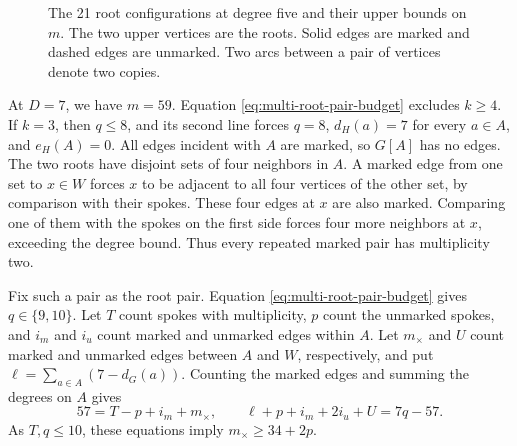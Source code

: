 \documentclass[preprint,11pt,numbers]{elsarticle-arxiv}
\makeatletter
\newcommand{\FloatBarrier}{\par\ifx\@deferlist\@empty\else\clearpage\fi}}
\numberwithin{equation}{section}
\theoremstyle{definition}
\makeatother
\begin{document}
\begin{figure}[htbp]
\caption{The 21 root configurations at degree five and their upper bounds on $m$. The two upper vertices are the roots. Solid edges are marked and dashed edges are unmarked. Two arcs between a pair of vertices denote two copies.}
\label{fig:finite-five-spokes}
\end{figure}
\FloatBarrier

At $D=7$, we have $m=59$. Equation
\eqref{eq:multi-root-pair-budget} excludes $k\ge4$. If
$k=3$, then $q\le8$, and its second line forces $q=8$,
$d_H(a)=7$ for every $a\in A$, and $e_H(A)=0$.
All edges incident with $A$ are marked, so $G[A]$ has no
edges. The two roots have disjoint sets of four neighbors in
$A$. A marked edge from one set to $x\in W$ forces $x$ to
be adjacent to all four vertices of the other set, by comparison
with their spokes. These four edges at $x$ are also marked.
Comparing one of them with the spokes on the first side forces
four more neighbors at $x$, exceeding the degree bound.
Thus every repeated marked pair has multiplicity two.

Fix such a pair as the root pair. Equation
\eqref{eq:multi-root-pair-budget} gives $q\in\{9,10\}$.
Let $T$ count spokes with multiplicity, $p$ count the
unmarked spokes, and $i_m$ and $i_u$ count marked and
unmarked edges within $A$. Let $m_\times$ and $U$ count
marked and unmarked edges between $A$ and $W$, respectively,
and put $\ell=\sum_{a\in A}(7-d_G(a))$. Counting the
marked edges and summing the degrees on $A$ gives
\begin{equation}\label{eq:multi-seven-counts}
 57=T-p+i_m+m_\times,\qquad
 \ell+p+i_m+2i_u+U=7q-57.
\end{equation}
As $T,q\le10$, these equations imply $m_\times\ge34+2p$.
\end{document}
